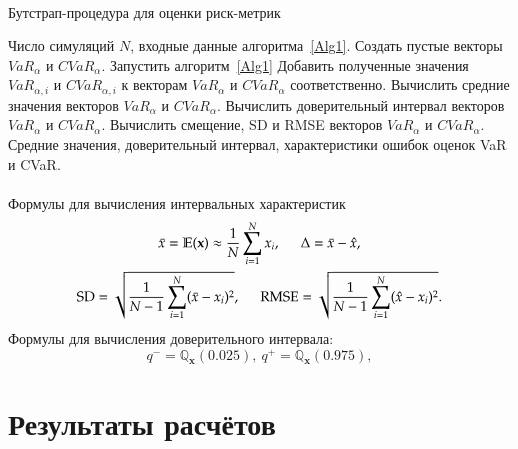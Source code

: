\documentclass[aspectratio=169]{beamer}
\begin{document}
\begin{frame}{\insertsection}
    \framesubtitle{\insertsubsection}
    \begin{algorithm}[H]
    \footnotesize
    \caption{Бутстрап-процедура для оценки риск-метрик}
    \begin{algorithmic}[1]
    	\Require Число симуляций $N$, входные данные алгоритма~\ref{Alg1}.
    	\State Создать пустые векторы $\textit{VaR}_\alpha$ и $\textit{CVaR}_\alpha$.
    	    \State Запустить алгоритм~\ref{Alg1}
    	    \State Добавить полученные значения $\textit{VaR}_{\alpha, i}$ и $\textit{CVaR}_{\alpha, i}$ к векторам $\textit{VaR}_\alpha$ и $\textit{CVaR}_\alpha$ соответственно.
    	\EndFor
    	\State Вычислить средние значения векторов $\textit{VaR}_\alpha$ и $\textit{CVaR}_\alpha$.
    	\State Вычислить доверительный интервал векторов $\textit{VaR}_\alpha$ и $\textit{CVaR}_\alpha$.
    	\State Вычислить смещение, SD и RMSE векторов $\textit{VaR}_\alpha$ и $\textit{CVaR}_\alpha$.
    	\Ensure Средние значения, доверительный интервал, характеристики ошибок оценок VaR и CVaR.
    \end{algorithmic}
    \end{algorithm}
\end{frame}

\begin{frame}{\insertsection}
    \framesubtitle{\insertsubsection}
    Формулы для вычисления интервальных характеристик
    \begin{gather}
        \bar{x} = \mathbb{E} (\textbf{x}) \approx \frac{1}{N} \sum_{i=1}^N x_i, \hspace{0.5cm}
        \Delta = \bar{x} - \hat{x}, \label{boot-bias} \nonumber\\
        \text{SD} = \sqrt{\frac{1}{N-1} \sum_{i=1}^N (\bar{x} - x_i)^2}, \hspace{0.5cm}
        \text{RMSE} = \sqrt{\frac{1}{N-1} \sum_{i=1}^N (\hat{x} - x_i)^2}.\nonumber
    \end{gather}
    Формулы для вычисления доверительного интервала:
    \begin{equation}
        q^- = \mathbb{Q}_{\textbf{x}} (0.025), \ q^+ = \mathbb{Q}_{\textbf{x}} (0.975),\nonumber
    \end{equation}
\end{frame}

\section{Результаты расчётов}
\end{document}
